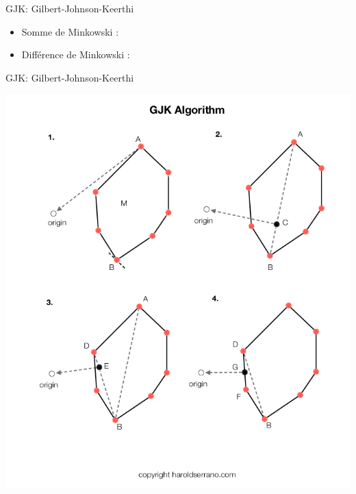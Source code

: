 \begin{frame} {GJK: Gilbert-Johnson-Keerthi}
  \begin{itemize}
    \item<1> Somme de Minkowski :
    \item<2> Diff\'erence de Minkowski :
  \end{itemize}
\end{frame}

\begin{frame} {GJK: Gilbert-Johnson-Keerthi}
  \centerline{ \includegraphics[width=.6\linewidth]{img/gjk/gjk.jpeg} }
\end{frame}
